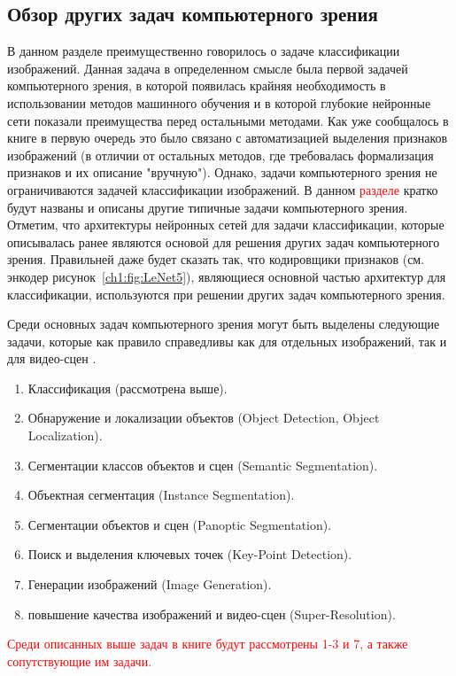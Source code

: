 \documentclass[12pt]{article}
\begin{document}
\begin{sloppypar}
\newpage
\subsection{Обзор других задач компьютерного зрения}

В данном разделе преимущественно говорилось о задаче классификации изображений. Данная задача в определенном смысле была первой задачей компьютерного зрения, в которой появилась крайняя необходимость в использовании методов машинного обучения и в которой глубокие нейронные сети показали преимущества перед остальными методами. Как уже сообщалось в книге в первую очередь это было связано с автоматизацией выделения признаков изображений (в отличии от остальных методов, где требовалась формализация признаков и их описание "вручную"). Однако, задачи компьютерного зрения не ограничиваются задачей классификации изображений. В данном \textcolor{red}{разделе} кратко будут названы и описаны другие типичные задачи компьютерного зрения. Отметим, что архитектуры нейронных сетей для задачи классификации, которые описывалась ранее являются основой для решения других задач компьютерного зрения. Правильней даже будет сказать так, что кодировщики признаков (см. энкодер  рисунок~\ref{ch1:fig:LeNet5}), являющиеся основной частью архитектур для классификации, используются при решении других задач компьютерного зрения.

Среди основных задач компьютерного зрения могут быть выделены следующие задачи, которые как правило справедливы как для отдельных изображений, так и для видео-сцен 
\cite{srinivas2016taxonomy}.
\begin{enumerate} \itemsep 0.05em 
    \item Классификация (рассмотрена выше).
    \item Обнаружение и локализации объектов (Object Detection, 
    Object Localization). 
    \item Сегментации классов объектов и сцен (Semantic Segmentation).
    \item Объектная сегментация (Instance Segmentation).
    \item Сегментации объектов и сцен (Panoptic Segmentation).
    \item Поиск и выделения ключевых точек (Key-Point Detection).
    \item Генерации изображений (Image Generation).
    \item повышение качества изображений и видео-сцен (Super-Resolution).
\end{enumerate}
\textcolor{red}{
Среди описанных выше задач в книге будут рассмотрены 1-3 и 7, а также сопутствующие им задачи.}


\end{sloppypar}
\end{document}
